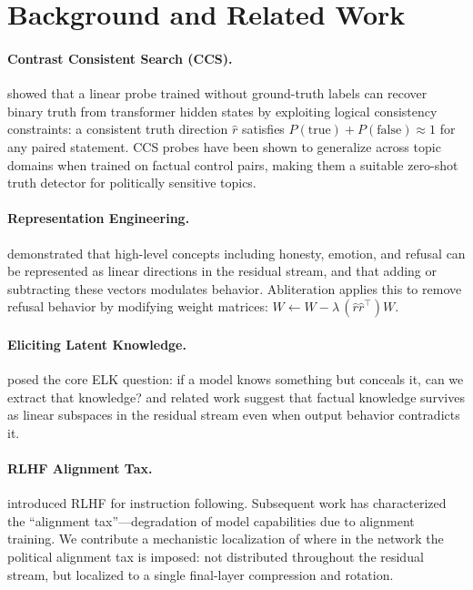 \documentclass[12pt]{article}
\theoremstyle{definition}
\begin{document}
\section{Background and Related Work}
\label{sec:background}

\paragraph{Contrast Consistent Search (CCS).}
\citet{burns2022discovering} showed that a linear probe trained without ground-truth labels
can recover binary truth from transformer hidden states by exploiting logical consistency
constraints: a consistent truth direction $\hat{r}$ satisfies $P(\text{true}) +
P(\text{false}) \approx 1$ for any paired statement. CCS probes have been shown to
generalize across topic domains when trained on factual control pairs, making them a
suitable zero-shot truth detector for politically sensitive topics.

\paragraph{Representation Engineering.}
\citet{zou2023representation} demonstrated that high-level concepts including honesty,
emotion, and refusal can be represented as linear directions in the residual stream, and
that adding or subtracting these vectors modulates behavior. Abliteration
\citep{arditi2024refusal} applies this to remove refusal behavior by modifying weight
matrices: $W \leftarrow W - \lambda\, (\hat{r} \hat{r}^\top) W$.

\paragraph{Eliciting Latent Knowledge.}
\citet{christiano2022elk} posed the core ELK question: if a model knows something but
conceals it, can we extract that knowledge? \citet{marks2023geometry} and related work
suggest that factual knowledge survives as linear subspaces in the residual stream even
when output behavior contradicts it.

\paragraph{RLHF Alignment Tax.}
\citet{ouyang2022training} introduced RLHF for instruction following. Subsequent work has
characterized the ``alignment tax''---degradation of model capabilities due to alignment
training. We contribute a mechanistic localization of where in the network the political
alignment tax is imposed: not distributed throughout the residual stream, but localized
to a single final-layer compression and rotation.
\end{document}
